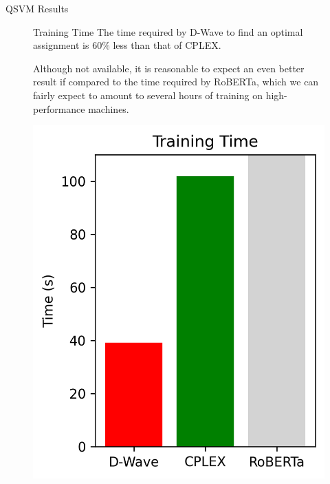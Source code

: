 \begin{block}{QSVM Results}
    \begin{figure}[h!]
        \centering
        \begin{minipage}{0.65\textwidth}
            \begin{alertblock}{Training Time}
                The time required by D-Wave to find an optimal assignment is 60\% less than that of CPLEX. 

                Although not available, it is reasonable to expect an even better result if compared to the time required by RoBERTa, which we can fairly expect to amount to several hours of training on high-performance machines.
            \end{alertblock}
        \end{minipage}%
        \hfill
        \begin{minipage}{0.3\textwidth}
            \centering
            \includegraphics[height=0.14\textheight]{logos/training.png}
        \end{minipage}
    \end{figure}


\end{block}
